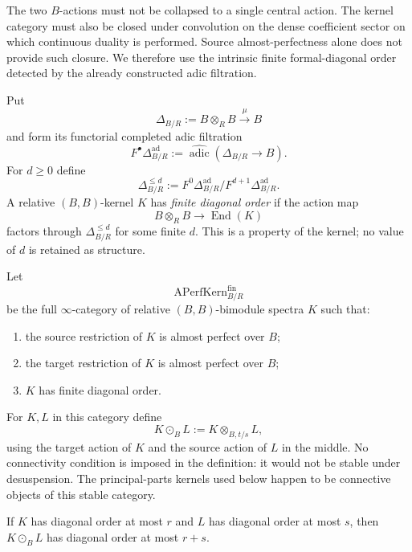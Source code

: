 The two $B$-actions must not be collapsed to a single central action.  The
kernel category must also be closed under convolution on the dense coefficient
sector on which continuous duality is performed.  Source almost-perfectness
alone does not provide such closure.  We therefore use the intrinsic finite
formal-diagonal order detected by the already constructed adic filtration.

\begin{definition}
\label{def:as-finite-diagonal-neighbourhoods}
Put
\[
    \Delta_{B/R}:=B\otimes_RB\xrightarrow{\mu}B
\]
and form its functorial completed adic filtration
\[
    F^\bullet\Delta_{B/R}^{\mathrm{ad}}
    :=
    \widehat{\operatorname{adic}}(\Delta_{B/R}\to B).
\]
For $d\geq0$ define
\[
\boxed{
    \Delta_{B/R}^{\leq d}
    :=
    F^0\Delta_{B/R}^{\mathrm{ad}}
    /F^{d+1}\Delta_{B/R}^{\mathrm{ad}}.
}
\]
A relative $(B,B)$-kernel $K$ has \emph{finite diagonal order} if the action
map
\[
    B\otimes_RB\longrightarrow\operatorname{End}(K)
\]
factors through $\Delta_{B/R}^{\leq d}$ for some finite $d$.  This is a
property of the kernel; no value of $d$ is retained as structure.
\end{definition}

\begin{definition}
\label{def:as-aperf-kernels}
Let
\[
\boxed{
    \operatorname{APerfKern}^{\mathrm{fin}}_{B/R}
}
\]
be the full $\infty$-category of relative $(B,B)$-bimodule spectra $K$ such
that:
\begin{enumerate}
    \item the source restriction of $K$ is almost perfect over $B$;
    \item the target restriction of $K$ is almost perfect over $B$;
    \item $K$ has finite diagonal order.
\end{enumerate}
For $K,L$ in this category define
\[
\boxed{
    K\odot_BL
    :=
    K\otimes_{B,t/s}L,
}
\]
using the target action of $K$ and the source action of $L$ in the middle.
No connectivity condition is imposed in the definition: it would not be
stable under desuspension.  The principal-parts kernels used below happen to
be connective objects of this stable category.
\end{definition}

\begin{lemma}
\label{lem:as-kernel-order-additive}
If $K$ has diagonal order at most $r$ and $L$ has diagonal order at most $s$,
then $K\odot_BL$ has diagonal order at most $r+s$.
\end{lemma}

